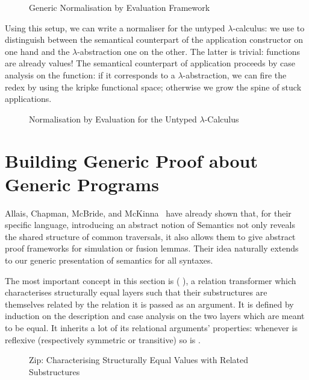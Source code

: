 \begin{figure}[h]
\caption{Generic Normalisation by Evaluation Framework}
\end{figure}

Using this setup, we can write a normaliser for the untyped
$\lambda$-calculus: we use  to distinguish between
the semantical counterpart of the application constructor on
one hand and the $\lambda$-abstraction one on the other.
The latter is trivial: functions are already
values! The semantical counterpart of application proceeds by
case analysis on the function: if it corresponds to a
$\lambda$-abstraction, we can fire the redex by using the kripke
functional space; otherwise we grow the spine of stuck
applications.


\begin{figure}[h]
\caption{Normalisation by Evaluation for the Untyped $\lambda$-Calculus}
\end{figure}


\section{Building Generic Proof about Generic Programs}\label{section:simulation}

Allais, Chapman, McBride, and McKinna~\citeyear{allais2017type} have
already shown that, for their specific language, introducing an abstract
notion of Semantics not only reveals the shared structure of common
traversals, it also allows them to give abstract proof frameworks for
simulation or fusion lemmas. Their idea naturally extends to our generic
presentation of semantics for all syntaxes.

The most important concept in this section is ( ), a relation
transformer which characterises structurally equal layers such that their
substructures are themselves related by the relation it is passed as an
argument. It is defined by induction on the description and case analysis
on the two layers which are meant to be equal. It inherits a lot of its
relational arguments' properties: whenever  is reflexive (respectively
symmetric or transitive) so is   .

\begin{figure}[h]
\caption{Zip: Characterising Structurally Equal Values with Related Substructures}
\end{figure}

